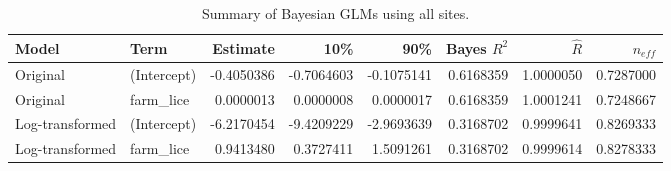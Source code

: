 \begin{table}
\centering
\caption{Summary of Bayesian GLMs using all sites.}
\centering
\begin{tabular}[t]{llrrrrrr}
\toprule
Model & Term & Estimate & 10\% & 90\% & Bayes $R^2$ & $\hat{R}$ & $n_{eff}$\\
\midrule
Original & (Intercept) & -0.4050386 & -0.7064603 & -0.1075141 & 0.6168359 & 1.0000050 & 0.7287000\\
Original & farm_lice & 0.0000013 & 0.0000008 & 0.0000017 & 0.6168359 & 1.0001241 & 0.7248667\\
Log-transformed & (Intercept) & -6.2170454 & -9.4209229 & -2.9693639 & 0.3168702 & 0.9999641 & 0.8269333\\
Log-transformed & farm_lice & 0.9413480 & 0.3727411 & 1.5091261 & 0.3168702 & 0.9999614 & 0.8278333\\
\bottomrule
\end{tabular}
\end{table}
